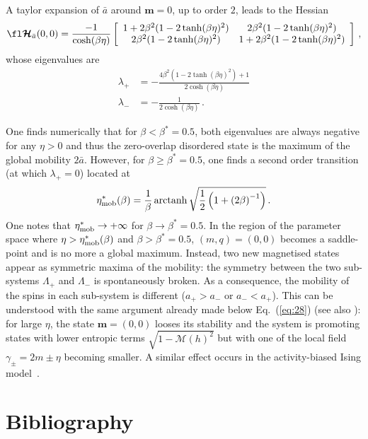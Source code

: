 \documentclass{iopart}
\newcommand{\eqref}[1]{(\ref{#1})}
\begin{document}
A taylor expansion of $\bar{a}$ around $\bm{m}=0$, up to order $2$, leads to the Hessian
\begin{equation}
  \label{eq:31}
  \fl
  \bm{\mathcal{H}}_{\bar{a}}(0,0) = \frac{-1}{\cosh(\beta \eta)}
  \left[
  \begin{array}{cc} %
    {1+2\beta^{2}(1-2\tanh(\beta \eta)^{2})} &     {2\beta^{2}(1-2\tanh(\beta \eta)^{2})} \\
    {2\beta^{2}(1-2\tanh(\beta \eta)^{2})}    &        {1+2\beta^{2}(1-2\tanh(\beta \eta)^{2})}
  \end{array} %
  \right]
  \, ,
\end{equation}
whose eigenvalues are
\begin{eqnarray}
  \label{eq:32}
  \lambda_{+} &= -\frac{4\beta^{2}(1-2\tanh(\beta \eta)^{2}) + 1}{2\cosh(\beta \eta)} \\
  \lambda_{-} &= - \frac{1}{2\cosh(\beta \eta)} \nonumber \, .
\end{eqnarray}

One finds numerically that for $\beta < \beta^{\ast}=0.5$, both eigenvalues are always negative for any $\eta>0$ and thus the zero-overlap disordered state is the maximum of the global mobility $2\bar{a}$.
However, for $\beta \geqslant \beta^{\ast}=0.5$, one finds a second order transition (at which $\lambda_{+}=0$) located at
\begin{equation}
  \label{eq:20}
  \eta_{\rm mob}^{\ast}(\beta) = \frac{1}{\beta}\, \mathrm{arctanh}\, \sqrt{ \frac{1}{2}\left( 1 + {(2\beta)}^{-1}\right)} \, .
\end{equation}
One notes that $\eta_{\rm mob}^{\ast} \to +\infty$ for $\beta \to \beta^{\ast}=0.5$.
In the region of the parameter space where $\eta> \eta_{\rm mob}^{\ast}(\beta)$ and $\beta> \beta^{\ast}=0.5$, $(m,q)=(0,0)$ becomes a saddle-point and is no more a global maximum. Instead, two new magnetised states appear as symmetric maxima of the mobility: the symmetry between the two sub-systems $\Lambda_{+}$ and $\Lambda_{-}$ is spontaneously broken. As a consequence, the mobility of the spins in each sub-system is different ($a_{+}>a_{-}$ or $a_{-}<a_{+}$). This can be understood with the same argument already made below Eq.~\eqref{eq:28} (see also \cite{GuiothJack2020}): for large $\eta$, the state $\bm{m}=(0,0)$ looses its stability and the system is promoting states with lower entropic terms $\sqrt{1-\mathcal{M}(h)^{2}}$ but with one of the local field $\gamma_{\pm}=2m \pm \eta$ becoming smaller. A similar effect occurs in the activity-biased Ising model~\cite{GuiothJack2020}.



\section*{Bibliography}



\end{document}
